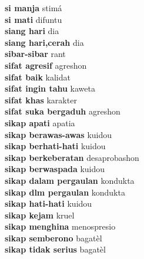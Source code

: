 \textbf{ si manja  } stimá \\
\textbf{ si mati  } difuntu \\
\textbf{ siang hari  } dia \\
\textbf{ siang hari,cerah  } dia \\
\textbf{ sibar-sibar  } rant \\
\textbf{ sifat agresif  } agreshon \\
\textbf{ sifat baik  } kalidat \\
\textbf{ sifat ingin tahu  } kaweta \\
\textbf{ sifat khas  } karakter \\
\textbf{ sifat suka bergaduh  } agreshon \\
\textbf{ sikap apati  } apatia \\
\textbf{ sikap berawas-awas  } kuidou \\
\textbf{ sikap berhati-hati  } kuidou \\
\textbf{ sikap berkeberatan  } desaprobashon \\
\textbf{ sikap berwaspada  } kuidou \\
\textbf{ sikap dalam pergaulan  } kondukta \\
\textbf{ sikap dlm pergaulan  } kondukta \\
\textbf{ sikap hati-hati  } kuidou \\
\textbf{ sikap kejam  } kruel \\
\textbf{ sikap menghina  } menospresio \\
\textbf{ sikap semberono  } bagatèl \\
\textbf{ sikap tidak serius  } bagatèl \\
